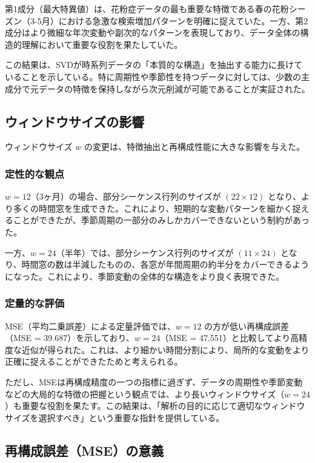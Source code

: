 \documentclass[a4paper,11pt]{jsarticle}
\begin{document}
第1成分（最大特異値）は、花粉症データの最も重要な特徴である春の花粉シーズン（3-5月）における急激な検索増加パターンを明確に捉えていた。一方、第2成分はより微細な年次変動や副次的なパターンを表現しており、データ全体の構造的理解において重要な役割を果たしていた。

この結果は、SVDが時系列データの「本質的な構造」を抽出する能力に長けていることを示している。特に周期性や季節性を持つデータに対しては、少数の主成分で元データの特徴を保持しながら次元削減が可能であることが実証された。

\subsection{ウィンドウサイズの影響}

ウィンドウサイズ $w$ の変更は、特徴抽出と再構成性能に大きな影響を与えた。

\subsubsection{定性的な観点}

$w=12$（3ヶ月）の場合、部分シーケンス行列のサイズが $(22 \times 12)$ となり、より多くの時間窓を生成できた。これにより、短期的な変動パターンを細かく捉えることができたが、季節周期の一部分のみしかカバーできないという制約があった。

一方、$w=24$（半年）では、部分シーケンス行列のサイズが $(11 \times 24)$ となり、時間窓の数は半減したものの、各窓が年間周期の約半分をカバーできるようになった。これにより、季節変動の全体的な構造をより良く表現できた。

\subsubsection{定量的な評価}

MSE（平均二乗誤差）による定量評価では、$w=12$ の方が低い再構成誤差（MSE = 39.687）を示しており、$w=24$（MSE = 47.551）と比較してより高精度な近似が得られた。これは、より細かい時間分割により、局所的な変動をより正確に捉えることができたためと考えられる。

ただし、MSEは再構成精度の一つの指標に過ぎず、データの周期性や季節変動などの大局的な特徴の把握という観点では、より長いウィンドウサイズ（$w=24$）も重要な役割を果たす。この結果は、「解析の目的に応じて適切なウィンドウサイズを選択すべき」という重要な指針を提供している。

\subsection{再構成誤差（MSE）の意義}
\end{document}
